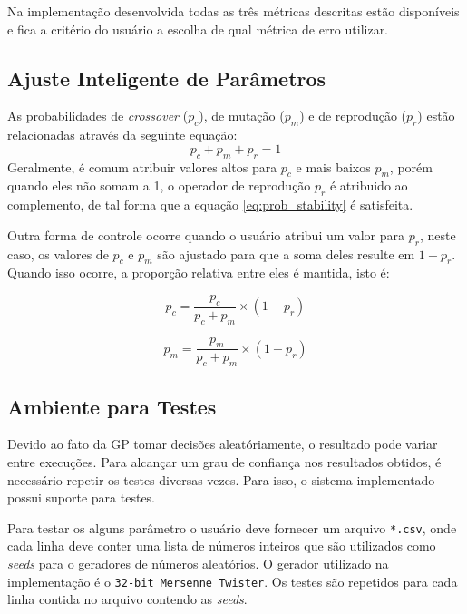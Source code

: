 \documentclass[a4paper]{paper}
\begin{document}
Na implementação desenvolvida todas as três métricas descritas estão disponíveis
e fica a critério do usuário a escolha de qual métrica de erro utilizar.

\subsection{Ajuste Inteligente de Parâmetros}\label{subsec:smart_par}

As probabilidades de \textit{crossover} ($p_c$), de mutação ($p_m$) e de
reprodução ($p_r$) estão relacionadas através da seguinte equação:
\begin{equation} \label{eq:prob_stability}
  p_c + p_m + p_r = 1
\end{equation}
Geralmente, é comum atribuir valores altos para $p_c$ e mais baixos $p_m$, porém
quando eles não somam a 1, o operador de reprodução $p_r$ é atribuido ao
complemento, de tal forma que a equação \ref{eq:prob_stability} é satisfeita.

Outra forma de controle ocorre quando o usuário atribui um valor para $p_r$,
neste caso, os valores de $p_c$ e $p_m$ são ajustado para que a soma deles
resulte em $1-p_r$. Quando isso ocorre, a proporção relativa entre eles é
mantida, isto é:

\noindent\begin{minipage}{.5\linewidth}
  \begin{equation*}
    p_c = \frac{p_c}{p_c+p_m}\times (1-p_r)  
  \end{equation*}
\end{minipage}
\begin{minipage}{.5\linewidth}
  \begin{equation*}
    p_m = \frac{p_m}{p_c+p_m}\times (1-p_r)  
  \end{equation*}
\end{minipage}

\subsection{Ambiente para Testes}

Devido ao fato da GP tomar decisões aleatóriamente, o resultado pode variar
entre execuções. Para alcançar um grau de confiança nos resultados obtidos, é
necessário repetir os testes diversas vezes. Para isso, o sistema implementado
possui suporte para testes.

Para testar os alguns parâmetro o usuário deve fornecer um arquivo
\texttt{*.csv}, onde cada linha deve conter uma lista de números inteiros que
são utilizados como \textit{seeds} para o geradores de números aleatórios. O
gerador utilizado na implementação é o \texttt{32-bit Mersenne Twister}. Os
testes são repetidos para cada linha contida no arquivo contendo as
\textit{seeds}.
\end{document}

